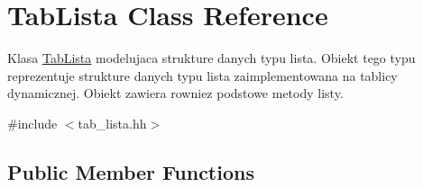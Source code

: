 \hypertarget{class_tab_lista}{}\section{Tab\+Lista Class Reference}
\label{class_tab_lista}


Klasa \hyperlink{class_tab_lista}{Tab\+Lista} modelujaca strukture danych typu lista. Obiekt tego typu reprezentuje strukture danych typu lista zaimplementowana na tablicy dynamicznej. Obiekt zawiera rowniez podstowe metody listy.  




{\ttfamily \#include $<$tab\+\_\+lista.\+hh$>$}

\subsection*{Public Member Functions}
